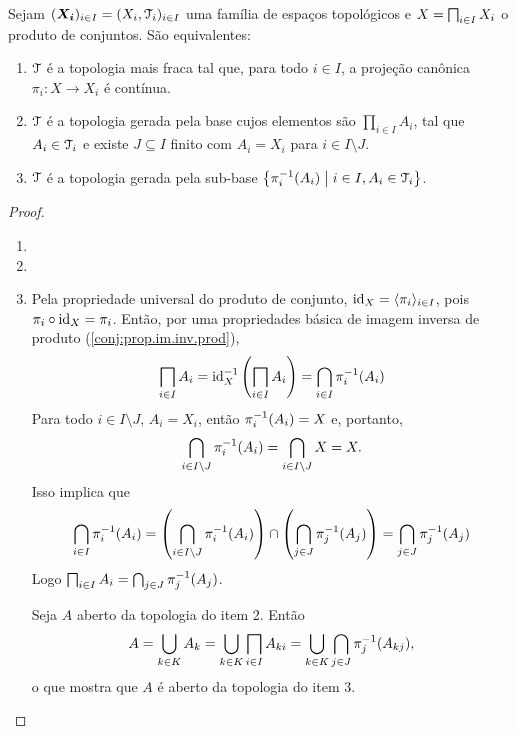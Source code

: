 \begin{prop}
Sejam $(\bm{X_i})_{i \in I} = (X_i,\mathcal{T}_i)_{i \in I}$ uma família de espaços topológicos e $X = \prod\idx X_i$ o produto de conjuntos. São equivalentes:
	\begin{enumerate}
	\item $\mathcal{T}$ é a topologia mais fraca tal que, para todo $i \in I$, a projeção canônica $\pi_i: X \to X_i$ é contínua.
	\item $\mathcal{T}$ é a topologia gerada pela base cujos elementos são $\prod_{i \in I} A_i$, tal que $A_i \in \mathcal{T}_i$ e existe $J \subseteq I$ finito com $A_i = X_i$ para $i \in I \setminus J$.
	\item $\mathcal{T}$ é a topologia gerada pela sub-base $\left\{\pi_i^{-1}(A_i) \;\middle\vert\; i \in I, A_i \in \mathcal{T}_i \right\}$.
	\end{enumerate}
\end{prop}
\begin{proof}
	\begin{enumerate}
	\item
	
	\item
	
	\item Pela propriedade universal do produto de conjunto, $\mathrm{id}_X = \langle \pi_i \rangle_{i \in I}$, pois $\pi_i \circ \mathrm{id}_X = \pi_i$. Então, por uma propriedades básica de imagem inversa de produto (\ref{conj:prop.im.inv.prod}),
	\begin{equation*}
	\prod_{i \in I} A_i = \id_X\inv \left(\prod_{i \in I} A_i\right) = \bigcap_{i \in I} \pi_i\inv(A_i)
	\end{equation*}
Para todo $i \in I \setminus J$, $A_i=X_i$, então $\pi_i^{-1}(A_i)=X$ e, portanto,
	\begin{equation*}
	\bigcap_{i \in I\setminus J} \pi_i^{-1}(A_i) = \bigcap_{i \in I\setminus J} X = X.
	\end{equation*}
Isso implica que
	\begin{equation*}
	\bigcap_{i \in I} \pi_i^{-1}(A_i) = \left(\bigcap_{i \in I\setminus J} \pi_i^{-1}(A_i)\right) \cap \left(\bigcap_{j \in J} \pi_j^{-1}(A_j)\right) =  \bigcap_{j \in J} \pi_j^{-1}(A_j)
	\end{equation*}
Logo $\prod_{i \in I} A_i = \bigcap_{j \in J} \pi_j\inv(A_j)$.

Seja $A$ aberto da topologia do item 2.	Então
	\begin{equation*}
	A = \bigcup_{k \in K} A_k = \bigcup_{k \in K}\prod_{i \in I} A_{ki} = \bigcup_{k \in K}\bigcap_{j \in J} \pi_j\inv (A_{kj}),
	\end{equation*}
o que mostra que $A$ é aberto da topologia do item 3.
	\end{enumerate}
\end{proof}

